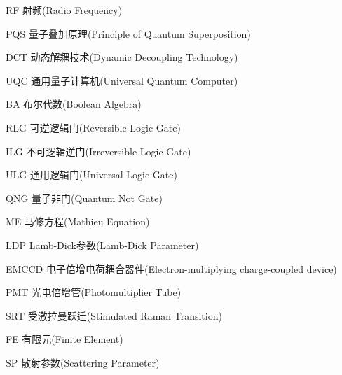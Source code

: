 



\begin{denotation}[3cm]
  \item[RF] 射频(Radio Frequency)
  \item[PQS] 量子叠加原理(Principle of Quantum Superposition)
  \item[DCT] 动态解耦技术(Dynamic Decoupling Technology)
  \item[UQC] 通用量子计算机(Universal Quantum Computer)
  \item[BA] 布尔代数(Boolean Algebra)
  \item[RLG] 可逆逻辑门(Reversible Logic Gate)
  \item[ILG] 不可逻辑逆门(Irreversible Logic Gate)
  \item[ULG] 通用逻辑门(Universal Logic Gate)
  \item[QNG] 量子非门(Quantum Not Gate)
  \item[ME] 马修方程(Mathieu Equation)
  \item[LDP] Lamb-Dick参数(Lamb-Dick Parameter)
  \item[EMCCD] 电子倍增电荷耦合器件(Electron-multiplying charge-coupled device)
  \item[PMT] 光电倍增管(Photomultiplier Tube)
  \item[SRT] 受激拉曼跃迁(Stimulated Raman Transition)
  \item[FE] 有限元(Finite Element)
  \item[SP] 散射参数(Scattering Parameter)
\end{denotation}



